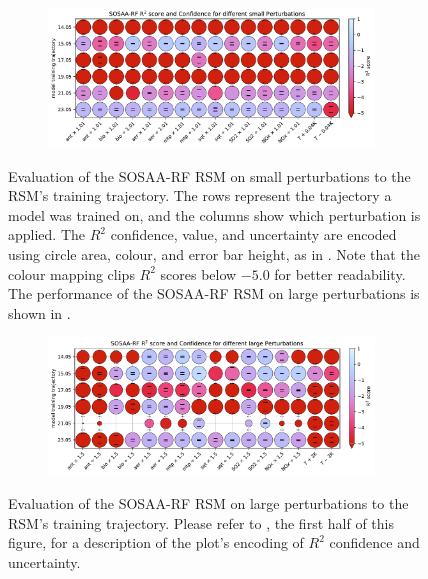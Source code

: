 \begin{figure}[H]
    \centering
    \begin{subfigure}
        \centering
        \includegraphics[width=0.95\textwidth]{evaluation/figures/results/perturbation-generalisation-rf-small.pdf}
    \end{subfigure}

    \vspace{-1em}
    \caption[Evaluation of the SOSAA-RF RSM on small Perturbations]{Evaluation of the SOSAA-RF RSM on small perturbations to the RSM's training trajectory. The rows represent the trajectory a model was trained on, and the columns show which perturbation is applied. The $R^2$ confidence, value, and uncertainty are encoded using circle area, colour, and error bar height, as in . Note that the colour mapping clips $R^2$ scores below $-5.0$ for better readability. The performance of the SOSAA-RF RSM on large perturbations is shown in .}
    \label{fig:sosaa-rsm-perturbations-rf-small}
\end{figure}

\begin{figure}[H]
    \centering
    \begin{subfigure}
        \centering
        \includegraphics[width=0.95\textwidth]{evaluation/figures/results/perturbation-generalisation-rf-large.pdf}
    \end{subfigure}

    \vspace{-1em}
    \caption[Evaluation of the SOSAA-RF RSM on large Perturbations]{Evaluation of the SOSAA-RF RSM on large perturbations to the RSM's training trajectory. Please refer to , the first half of this figure, for a description of the plot's encoding of $R^2$ confidence and uncertainty.}
    \label{fig:sosaa-rsm-perturbations-rf-large}
\end{figure}

